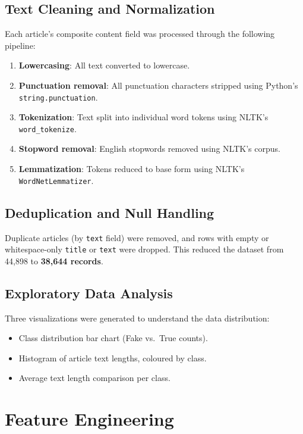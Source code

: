 \documentclass[12pt, a4paper]{article}
\begin{document}
\subsection{Text Cleaning and Normalization}
Each article's composite content field was processed through the following pipeline:
\begin{enumerate}[nosep]
    \item \textbf{Lowercasing}: All text converted to lowercase.
    \item \textbf{Punctuation removal}: All punctuation characters stripped using Python's \texttt{string.punctuation}.
    \item \textbf{Tokenization}: Text split into individual word tokens using NLTK's \texttt{word\_tokenize}.
    \item \textbf{Stopword removal}: English stopwords removed using NLTK's corpus.
    \item \textbf{Lemmatization}: Tokens reduced to base form using NLTK's \texttt{WordNetLemmatizer}.
\end{enumerate}

\subsection{Deduplication and Null Handling}
Duplicate articles (by \texttt{text} field) were removed, and rows with empty or whitespace-only \texttt{title} or \texttt{text} were dropped. This reduced the dataset from 44,898 to \textbf{38,644 records}.

\subsection{Exploratory Data Analysis}
Three visualizations were generated to understand the data distribution:
\begin{itemize}[nosep]
    \item Class distribution bar chart (Fake vs.\ True counts).
    \item Histogram of article text lengths, coloured by class.
    \item Average text length comparison per class.
\end{itemize}

\section{Feature Engineering}
\end{document}
